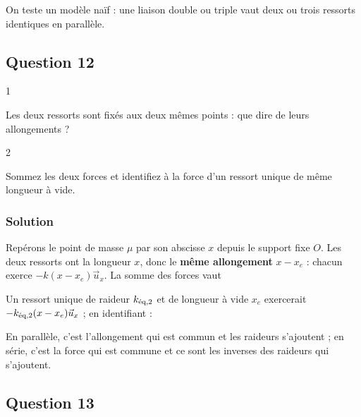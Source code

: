 \documentclass[11pt,a4paper]{article}
\newcommand{\equationajustee}[1]{%
  \sbox{\boiteequation}{$\displaystyle #1$}%
  \ifdim\wd\boiteequation>\linewidth
    \[\resizebox{\linewidth}{!}{\usebox{\boiteequation}}\]%
  \else
    \[#1\]%
  \fi}
\begin{document}
On teste un modèle naïf : une liaison double ou triple vaut deux ou trois ressorts identiques en parallèle.

\hypertarget{question-12}{%
\subsection{Question 12}\label{question-12}}

\begin{indication}{1}

Les deux ressorts sont fixés aux deux mêmes points : que dire de leurs allongements ?

\end{indication}

\begin{indication}{2}

Sommez les deux forces et identifiez à la force d'un ressort unique de même longueur à vide.

\end{indication}

\hypertarget{solution-11}{%
\subsubsection{Solution}\label{solution-11}}

Repérons le point de masse \(\mu\) par son abscisse \(x\) depuis le support fixe \(O\). Les deux ressorts ont la longueur \(x\), donc le \textbf{même allongement} \(x - x_e\) : chacun exerce \(-k(x - x_e)\vec u_x\). La somme des forces vaut

\equationajustee{\sum\vec F = -2k(x - x_e)\,\vec u_x}

Un ressort unique de raideur \(k_{\text{\text{éq}},2}\) et de longueur à vide \(x_e\) exercerait \(-k_{\text{\text{éq}},2}(x - x_e)\vec u_x\) ; en identifiant :

\equationajustee{\boxed{k_{\text{\text{éq}},2} = 2k}}

\begin{piege}

En parallèle, c'est l'allongement qui est commun et les raideurs s'ajoutent ; en série, c'est la force qui est commune et ce sont les inverses des raideurs qui s'ajoutent.

\end{piege}

\hypertarget{question-13}{%
\subsection{Question 13}\label{question-13}}
\end{document}
